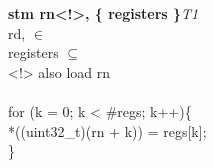 


\begin{instructionblock}{\imagewidth}%
    \textbf{stm rn<!>, \{ registers \}}\hfill\textit{T1}\\
    rd, $\in$ \baseregisters\\
    registers $\subseteq$ \baseregisters\\
    <!> also load rn\\
    {}\\
    for (k = 0; k < \#regs; k++)\{\\
    *((uint32\_t)(rn + k)) = regs[k];\\
    \}
\end{instructionblock}


